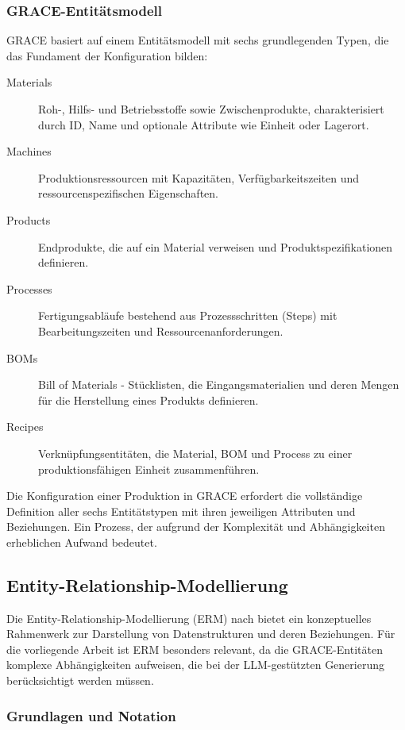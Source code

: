 \subsubsection{GRACE-Entitätsmodell}
\label{subsubsec:GRACEEntitaeten}

GRACE basiert auf einem Entitätsmodell mit sechs grundlegenden Typen, die das Fundament der Konfiguration bilden:

\begin{description}
    \item[Materials] Roh-, Hilfs- und Betriebsstoffe sowie Zwischenprodukte, charakterisiert durch ID, Name und optionale Attribute wie Einheit oder Lagerort.
    \item[Machines] Produktionsressourcen mit Kapazitäten, Verfügbarkeitszeiten und ressourcenspezifischen Eigenschaften.
    \item[Products] Endprodukte, die auf ein Material verweisen und Produktspezifikationen definieren.
    \item[Processes] Fertigungsabläufe bestehend aus Prozessschritten (Steps) mit Bearbeitungszeiten und Ressourcenanforderungen.
    \item[BOMs] Bill of Materials - Stücklisten, die Eingangsmaterialien und deren Mengen für die Herstellung eines Produkts definieren.
    \item[Recipes] Verknüpfungsentitäten, die Material, BOM und Process zu einer produktionsfähigen Einheit zusammenführen.
\end{description}


\noindent Die Konfiguration einer Produktion in GRACE erfordert die vollständige Definition aller sechs Entitätstypen mit ihren jeweiligen Attributen und Beziehungen. Ein Prozess, der aufgrund der Komplexität und Abhängigkeiten erheblichen Aufwand bedeutet.


\subsection{Entity-Relationship-Modellierung}
\label{subsec:ERM}

Die Entity-Relationship-Modellierung (ERM) nach \cite{chen:erm1976} bietet ein konzeptuelles Rahmenwerk zur Darstellung von Datenstrukturen und deren Beziehungen. Für die vorliegende Arbeit ist ERM besonders relevant, da die GRACE-Entitäten komplexe Abhängigkeiten aufweisen, die bei der LLM-gestützten Generierung berücksichtigt werden müssen.

\subsubsection{Grundlagen und Notation}
\label{subsubsec:ERMGrundlagen}

